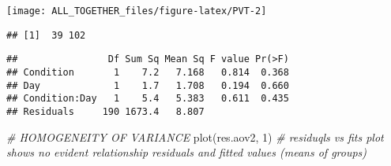 \documentclass[
]{article}
\newenvironment{Shaded}{\begin{snugshade}}{\end{snugshade}}
\newcommand{\AttributeTok}[1]{\textcolor[rgb]{0.77,0.63,0.00}{#1}}
\newcommand{\CommentTok}[1]{\textcolor[rgb]{0.56,0.35,0.01}{\textit{#1}}}
\newcommand{\DecValTok}[1]{\textcolor[rgb]{0.00,0.00,0.81}{#1}}
\newcommand{\DocumentationTok}[1]{\textcolor[rgb]{0.56,0.35,0.01}{\textbf{\textit{#1}}}}
\newcommand{\FunctionTok}[1]{\textcolor[rgb]{0.00,0.00,0.00}{#1}}
\newcommand{\NormalTok}[1]{#1}
\newcommand{\OtherTok}[1]{\textcolor[rgb]{0.56,0.35,0.01}{#1}}
\newcommand{\SpecialCharTok}[1]{\textcolor[rgb]{0.00,0.00,0.00}{#1}}
\begin{document}
\begin{Shaded}
\end{Shaded}

\texttt{[image: ALL\_TOGETHER\_files/figure-latex/PVT-2]}

\begin{verbatim}
## [1]  39 102
\end{verbatim}

\begin{Shaded}
\end{Shaded}

\begin{verbatim}
##                Df Sum Sq Mean Sq F value Pr(>F)
## Condition       1    7.2   7.168   0.814  0.368
## Day             1    1.7   1.708   0.194  0.660
## Condition:Day   1    5.4   5.383   0.611  0.435
## Residuals     190 1673.4   8.807
\end{verbatim}

\begin{Shaded}
\begin{Highlighting}[]
\CommentTok{\# HOMOGENEITY OF VARIANCE}
\FunctionTok{plot}\NormalTok{(res.aov2, }\DecValTok{1}\NormalTok{) }\CommentTok{\# residuqls vs fits plot shows no evident relationship residuals and fitted values (means of groups)}
\end{Highlighting}
\end{Shaded}
\end{document}
